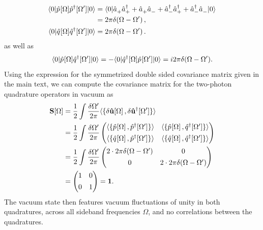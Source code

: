 \begin{align*}
\langle 0 | \hat{p}^{\vphantom{\dagger}}[\Omega] \hat{p}^{\dagger}[\Omega'] | 0 \rangle & =  \langle 0 | \hat{a}^{\vphantom{\dagger}}_{+}\hat{a}^{\dagger}_{+} +  \hat{a}^{\vphantom{\dagger}}_{+} \hat{a}^{\vphantom{\dagger}}_{-} +   \hat{a}^{\dagger}_{-} \hat{a}^{\dagger}_{+}  + \hat{a}^{\dagger}_{-}\hat{a}^{\vphantom{\dagger}}_{-}|0 \rangle \\
& = 2 \pi \delta(\Omega - \Omega') \,, \\
\langle 0 | \hat{q}^{\vphantom{\dagger}}[\Omega] \hat{q}^{\dagger}[\Omega'] | 0 \rangle & = 2 \pi \delta(\Omega - \Omega') \,. \\
\end{align*}
as well as 
\[\langle 0 | \hat{p}^{\vphantom{\dagger}}[\Omega] \hat{q}^{\dagger}[\Omega'] | 0 \rangle = - \langle 0 | \hat{q}^{\dagger}[\Omega] \hat{p}^{\vphantom{\dagger}}[\Omega'] | 0 \rangle = i 2\pi \delta (\Omega - \Omega'). \]
Using the expression for the symmetrized double sided covariance matrix given in the main text, we can compute the covariance matrix for the two-photon quadrature operators in vacuum as
\begin{align*}
  \mathbf{S}[\Omega]& =  \dfrac{1}{2}  \int \dfrac{\delta \Omega'}{2\pi} \langle\{  \delta \mathbf{\hat{u}}{\vphantom{\dagger}}[\Omega]\, , \delta \mathbf{\hat{u}}^{\dagger}[\Omega'] \}  \rangle \\
  & = \dfrac{1}{2}  \int \dfrac{\delta \Omega'}{2\pi}  \begin{pmatrix}
  \langle \{ \hat{p}^{\vphantom{\dagger}}[\Omega]\,, \hat{p}^{\dagger}[\Omega'] \}\rangle & \langle \{ \hat{p}^{\vphantom{\dagger}}[\Omega]\,, \hat{q}^{\dagger}[\Omega'] \} \rangle \\[4pt]
  \langle \{ \hat{q}^{\vphantom{\dagger}}[\Omega]\,, \hat{p}^{\dagger}[\Omega'] \} \rangle & \langle \{ \hat{q}^{\vphantom{\dagger}}[\Omega]\,, \hat{q}^{\dagger}[\Omega'] \} \rangle \\
  \end{pmatrix} \\
  & = \dfrac{1}{2}  \int \dfrac{\delta \Omega'}{2\pi}  \begin{pmatrix}
  2 \cdot 2 \pi \delta(\Omega - \Omega') & 0 \\[4pt]
  0 & 2 \cdot 2 \pi \delta(\Omega - \Omega') \\
  \end{pmatrix} \\
  & = \begin{pmatrix}
  1 & 0 \\[4pt] 
  0 & 1 \\
  \end{pmatrix} = \mathbf{1}.
\end{align*}
The vacuum state then features vacuum fluctuations of unity in both quadratures, across all sideband frequencies $\Omega$, and no correlations between the quadratures. 

